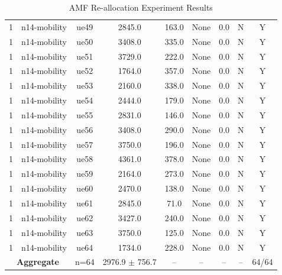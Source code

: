 \begin{table}[ht]
\begin{tabular}{|c|c|c|c|c|c|c|c|c|}
1 & n14-mobility & ue49 & 2845.0 & 163.0 & None & 0.0 & N & Y \\
1 & n14-mobility & ue50 & 3408.0 & 335.0 & None & 0.0 & N & Y \\
1 & n14-mobility & ue51 & 3729.0 & 222.0 & None & 0.0 & N & Y \\
1 & n14-mobility & ue52 & 1764.0 & 357.0 & None & 0.0 & N & Y \\
1 & n14-mobility & ue53 & 2160.0 & 338.0 & None & 0.0 & N & Y \\
1 & n14-mobility & ue54 & 2444.0 & 179.0 & None & 0.0 & N & Y \\
1 & n14-mobility & ue55 & 2831.0 & 146.0 & None & 0.0 & N & Y \\
1 & n14-mobility & ue56 & 3408.0 & 290.0 & None & 0.0 & N & Y \\
1 & n14-mobility & ue57 & 3750.0 & 196.0 & None & 0.0 & N & Y \\
1 & n14-mobility & ue58 & 4361.0 & 378.0 & None & 0.0 & N & Y \\
1 & n14-mobility & ue59 & 2164.0 & 273.0 & None & 0.0 & N & Y \\
1 & n14-mobility & ue60 & 2470.0 & 138.0 & None & 0.0 & N & Y \\
1 & n14-mobility & ue61 & 2845.0 & 71.0 & None & 0.0 & N & Y \\
1 & n14-mobility & ue62 & 3427.0 & 240.0 & None & 0.0 & N & Y \\
1 & n14-mobility & ue63 & 3750.0 & 125.0 & None & 0.0 & N & Y \\
1 & n14-mobility & ue64 & 1734.0 & 228.0 & None & 0.0 & N & Y \\
\multicolumn{2}{|c|}{\textbf{Aggregate}} & n=64 & 2976.9 $\pm$ 756.7 & -- & -- & -- & -- & 64/64 \\
\hline
\end{tabular}
\caption{AMF Re-allocation Experiment Results}
\label{tab:amf_realloc}
\end{table}
